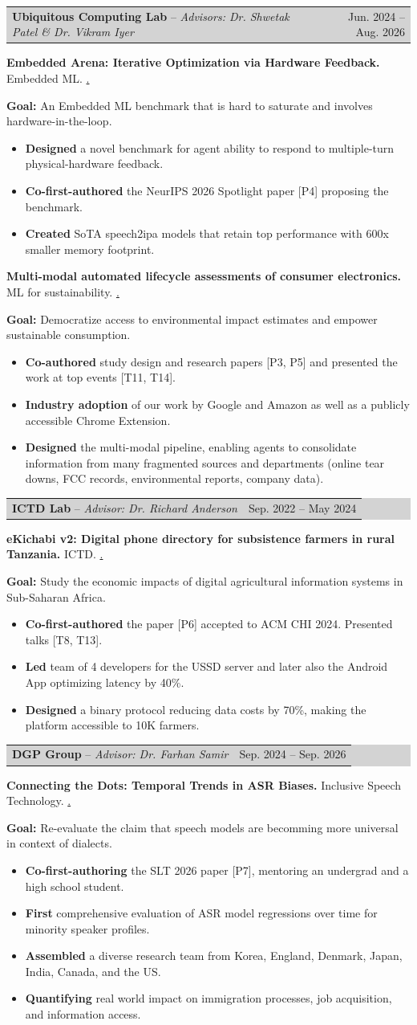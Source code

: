 \documentclass[letterpaper,11pt]{article}
\makeatletter
\newcommand{\resumeItem}[2]{
    \item\small{
        \textbf{#1}{#2 \vspace{-2pt}}
    }
}
\newcommand{\resumeSubheadingStrong}[3]{
    \vspace{-1pt}\item[]
    \begingroup\setlength{\fboxsep}{1pt}
    \hspace{-5pt}\colorbox{lightgray}{
        \begin{tabular*}{0.97\textwidth}{l@{\extracolsep{\fill}}r}
            \vspace{-2pt}\textbf{#1} -- \textit{#2} & #3 \\
        \end{tabular*}
    }\endgroup\vspace{-15pt}\vspace{0pt}
}
\newcommand{\resumeSubSubheading}[2]{
    \vspace{-1pt}\item[]
    \textbf{#1} #2
    \vspace{-2pt}
}
\newcommand{\resumeItemListStart}{\begin{itemize}}
\newcommand{\resumeItemListEnd}{\end{itemize}\vspace{-5pt}}
\makeatother
\begin{document}
\resumeSubheadingStrong{Ubiquitous Computing Lab}{Advisors: Dr. Shwetak Patel \& Dr. Vikram Iyer}{Jun. 2024 -- Aug. 2026}
\resumeSubSubheading{Embedded Arena: Iterative Optimization via Hardware Feedback.}{Embedded ML. \href{https://ubicomplab.github.io/embedded-arena/}{\dotuline{Link}.}}
\resumeSubSubheading{Goal:}{An Embedded ML benchmark that is hard to saturate and involves hardware-in-the-loop.}
\resumeItemListStart
\resumeItem{Designed}{
    a novel benchmark for agent ability to respond to multiple-turn physical-hardware feedback.
}
\resumeItem{Co-first-authored}{
    the NeurIPS 2026 Spotlight paper [P4] proposing the benchmark.
}
\resumeItem{Created}{
    SoTA speech2ipa models that retain top performance with 600x smaller memory footprint.
}
\resumeItemListEnd

\resumeSubSubheading{Multi-modal automated lifecycle assessments of consumer electronics.}{ML for sustainability. \href{https://iamzhihanzhang.github.io/AI-Agents-for-LCA/}{\dotuline{Link}.}}
\resumeSubSubheading{Goal:}{Democratize access to environmental impact estimates and empower sustainable consumption.}
\resumeItemListStart
\resumeItem{Co-authored}{
    study design and research papers [P3, P5] and presented the work at top events [T11, T14].
}
\resumeItem{Industry adoption}{
    of our work by Google and Amazon as well as a publicly accessible Chrome Extension.
}
\resumeItem{Designed}{
    the multi-modal pipeline, enabling agents to consolidate information from many fragmented sources and departments (online tear downs, FCC records, environmental reports, company data).
}
\resumeItemListEnd

\resumeSubheadingStrong{ICTD Lab}{Advisor: Dr. Richard Anderson}{Sep. 2022 -- May 2024}
\resumeSubSubheading{eKichabi v2: Digital phone directory for subsistence farmers in rural Tanzania.}{ICTD. \href{https://github.com/SanderGi/eKichabi}{\dotuline{Link}.}}
\resumeSubSubheading{Goal:}{Study the economic impacts of digital agricultural information systems in Sub-Saharan Africa.}
\resumeItemListStart
\resumeItem{Co-first-authored}{
    the paper [P6] accepted to ACM CHI 2024. Presented talks [T8, T13].
}
\resumeItem{Led}{
    team of 4 developers for the USSD server and later also the Android App optimizing latency by 40\%.
}
\resumeItem{Designed}{
    a binary protocol reducing data costs by 70\%, making the platform accessible to 10K farmers.
}
\resumeItemListEnd

\resumeSubheadingStrong{DGP Group}{Advisor: Dr. Farhan Samir}{Sep. 2024 -- Sep. 2026}
\resumeSubSubheading{Connecting the Dots: Temporal Trends in ASR Biases.}{Inclusive Speech Technology. \href{https://nlp.cs.ubc.ca/}{\dotuline{Link}.}}
\resumeSubSubheading{Goal:}{Re-evaluate the claim that speech models are becomming more universal in context of dialects.}
\resumeItemListStart
\resumeItem{Co-first-authoring}{
    the SLT 2026 paper [P7], mentoring an undergrad and a high school student.
}
\resumeItem{First}{
    comprehensive evaluation of ASR model regressions over time for minority speaker profiles.
}
\resumeItem{Assembled}{
    a diverse research team from Korea, England, Denmark, Japan, India, Canada, and the US.
}
\resumeItem{Quantifying}{
    real world impact on immigration processes, job acquisition, and information access.
}
\resumeItemListEnd
\end{document}
